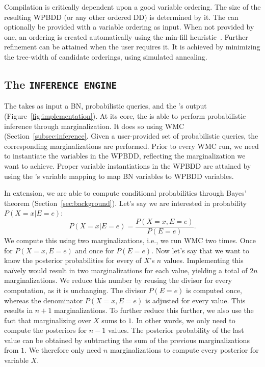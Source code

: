 Compilation is critically dependent upon a good variable ordering. The size of the resulting WPBDD (or any other ordered DD) is determined by it. The \compiler can optionally be provided with a variable ordering as input. When not provided by one, an ordering is created automatically using the min-fill heuristic~\cite{chavira2008probabilistic}. Further refinement can be attained when the user requires it. It is achieved by minimizing the tree-width of candidate orderings, using simulated annealing.

\subsection{The \texttt{INFERENCE ENGINE}}

The \engine takes as input a BN, probabilistic queries, and the \compiler's output (Figure~\ref{fig:implementation}). At its core, the \engine is able to perform probabilistic inference through marginalization. It does so using WMC (Section~\ref{subsec:inference}. Given a user-provided set of probabilistic queries, the corresponding marginalizations are performed. Prior to every WMC run, we need to instantiate the variables in the WPBDD, reflecting the marginalization we want to achieve. Proper variable instantiations in the WPBDD are attained by using the \compiler's variable mapping to map BN variables to WPBDD variables.

In extension, we are able to compute conditional probabilities through Bayes' theorem (Section~\ref{sec:background}). Let's say we are interested in probability $P(X = x | E = e)$:  \[P(X = x | E = e) = \frac{P(X = x, E = e)}{P(E = e)}.\]
We compute this using two marginalizations, i.e., we run WMC two times. Once for $P(X = x, E = e)$ and once for $P(E = e)$. Now let's say that we want to know the posterior probabilities for every of $X$'s $n$ values. Implementing this na\"ively would result in two marginalizations for each value, yielding a total of $2n$ marginalizations. We reduce this number by reusing the divisor for every computation, as it is unchanging. The divisor $P(E = e)$ is computed once, whereas the denominator $P(X = x, E = e)$ is adjusted for every value. This results in $n + 1$ marginalizations. To further reduce this further, we also use the fact that marginalizing over $X$ sums to $1$. In other words, we only need to compute the posteriors for $n-1$ values. The posterior probability of the last value can be obtained by subtracting the sum of the previous marginalizations from $1$. We therefore only need $n$ marginalizations to compute every posterior for variable $X$.

